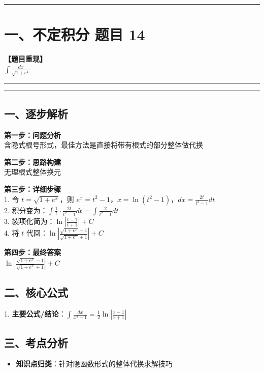 ﻿\documentclass[12pt, a4paper]{ctexart}
\newcommand{\TopSeparator}{
    \par\noindent\rule{\textwidth}{1.5pt}\vspace{0.5em}
}
\newcommand{\AnalysisSeparator}{
    \par\noindent\rule{\textwidth}{0.5pt}\vspace{0.2em}\hrule\vspace{0.5em}
}
\newenvironment{RedAnalysis}{
    \par
    \color{red} 
}{
    \par
    \color{black} 
}
\begin{document}
\vspace{2em}

\TopSeparator
\section*{一、不定积分 题目 14}

\textbf{【题目重现】} \\
$\int \frac{dx}{\sqrt{1+e^x}}$

\AnalysisSeparator

\begin{RedAnalysis}

	\subsection*{一、逐步解析}

	\textbf{第一步：问题分析} \\
	含隐式根号形式，最佳方法是直接将带有根式的部分整体做代换

	\textbf{第二步：思路构建} \\
	无理根式整体换元

	\textbf{第三步：详细步骤} \\
	1. 令 $t = \sqrt{1+e^x}$，则 $e^x = t^2-1$，$x = \ln(t^2-1)$，$dx = \frac{2t}{t^2-1} dt$ \\ 
	2. 积分变为：$\int \frac{1}{t} \cdot \frac{2t}{t^2-1} dt = \int \frac{2}{t^2-1} dt$ \\ 
	3. 裂项化简为：$\ln \left| \frac{t-1}{t+1} \right| + C$ \\ 
	4. 将 $t$ 代回：$\ln \left| \frac{\sqrt{1+e^x}-1}{\sqrt{1+e^x}+1} \right| + C$

	\textbf{第四步：最终答案} \\
	$\ln \left| \frac{\sqrt{1+e^x}-1}{\sqrt{1+e^x}+1} \right| + C$

	\subsection*{二、核心公式}
	1. \textbf{主要公式/结论}：$\int \frac{dx}{x^2-1} = \frac{1}{2} \ln \left| \frac{x-1}{x+1} \right|$

	\subsection*{三、考点分析}
	\begin{itemize}
		\item \textbf{知识点归类}：针对隐函数形式的整体代换求解技巧
	\end{itemize}

\end{RedAnalysis}
\end{document}
